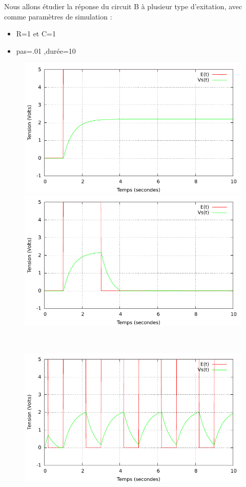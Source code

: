 \documentclass[a4paper,11pt]{article}
\begin{document}
   Nous allons étudier la réponse du circuit B à plusieur type d'exitation, avec comme paramètres de simulation :  \\
  \begin{itemize}
   \item R=1 et C=1
     \item pas=.01 ,durée=10 
  \end{itemize}
 
  \begin{figure}[h!]
   \begin{minipage}[b]{0.5\linewidth}
      \centering \includegraphics[scale=0.68]{CBechelon.pdf}
   \end{minipage}\hfill
   \begin{minipage}[b]{0.5\linewidth}   
      \centering \includegraphics[scale=.68]{CBporte.pdf}
   \end{minipage}\\
    \begin{minipage}[b]{0.5\linewidth}   
      \centering \includegraphics[scale=.68]{CBcarre.pdf}

\end{minipage}
\end{figure}
\end{document}
